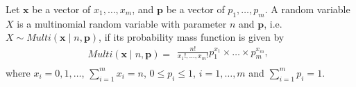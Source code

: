 \begin{definition2}
	Let $\mathbf{x}$ be a vector of $x_1, \ldots, x_m$, and $\mathbf p$ be a vector of $p_1, \ldots, p_m$. A random variable $X$ is a multinomial random variable with parameter $n$ and $\mathbf p$, i.e. $X \sim Multi(\mathbf x \mid n, \mathbf p)$, if its probability mass function is given by
	\[
	Multi(\mathbf x \mid n, \mathbf p) = \begin{array}{lll}
	\displaystyle \frac{n!}{x_1!, \ldots, x_m!} p^{x_1}_1 \times \ldots \times p^{x_m}_m, \\ 
	\end{array}
	\]
	\noindent where $x_i = 0, 1, \ldots$, $\displaystyle\sum_{i=1}^{m} x_i = n$, $0 \leq p_i \leq 1$, $i = 1, \ldots, m$ and $\displaystyle\sum_{i=1}^{m} p_i = 1$.
\end{definition2}